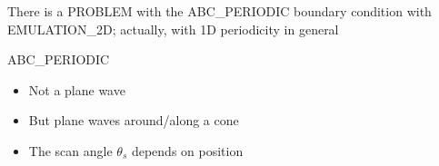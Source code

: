   \begin{frame}

    \vspace{2\baselineskip}
    
    {There is a PROBLEM with the ABC\_PERIODIC boundary condition with
      EMULATION\_2D; actually, with 1D periodicity in general}
    
  \end{frame}
 

  \begin{frame}{ABC\_PERIODIC}
    
  \begin{center}
  \end{center}

  \framebreak %

  \begin{itemize}
  \item Not a plane wave
  \item But plane waves around/along a cone
  \item The scan angle $\theta_s$ depends on position
  \end{itemize}
  
\end{frame}

